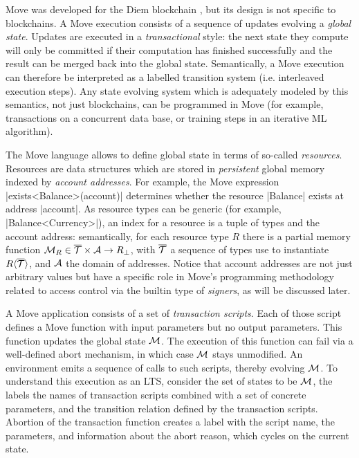 
Move was developed for the Diem blockchain \cite{DIEM}, but its design is not
specific to blockchains.  A Move execution consists of a sequence of updates
evolving a \emph{global state}.  Updates are executed in a \emph{transactional}
style: the next state they compute will only be committed if their computation
has finished successfully and the result can be merged back into the global
state. Semantically, a Move execution can therefore be interpreted as a labelled
transition system (i.e. interleaved execution steps). Any state evolving system
which is adequately modeled by this semantics, not just blockchains, can be
programmed in Move (for example, transactions on a concurrent data base, or
training steps in an iterative ML algorithm).

The Move language allows to define global state in terms of so-called
\emph{resources}.  Resources are data structures which are stored in
\emph{persistent} global memory indexed by \emph{account addresses}. For
example, the Move expression |exists<Balance>(account)| determines whether the
resource |Balance| exists at address |account|. As resource types can be generic
(for example, |Balance<Currency>|), an index for a resource is a tuple of types
and the account address: semantically, for each resource type $R$ there is a
partial memory function
$\mathcal{M}_R \in \overline{\mathcal{T}} \times \mathcal{A} \rightarrow R_\bot$, with
$\overline{\mathcal{T}}$ a sequence of types use to instantiate $R\langle\overline{\mathcal{T}}\rangle$,
and $\mathcal{A}$ the domain of addresses. Notice that account addresses are not just
arbitrary values but have a specific role in Move's programming methodology
related to access control via the builtin type of \emph{signers}, as will be
discussed later.

A Move application consists of a set of \emph{transaction scripts}. Each of
those script defines a Move function with input parameters but no output
parameters.  This function updates the global state $\mathcal{M}$. The execution of
this function can fail via a well-defined abort mechanism, in which case
$\mathcal{M}$ stays unmodified. An environment emits a sequence of calls to such
scripts, thereby evolving $\mathcal{M}$. To understand this execution as an LTS,
consider the set of states to be $\mathcal{M}$, the labels the names of transaction
scripts combined with a set of concrete parameters, and the transition relation
defined by the transaction scripts. Abortion of the transaction function creates
a label with the script name, the parameters, and information about the abort reason,
which cycles on the current state.

